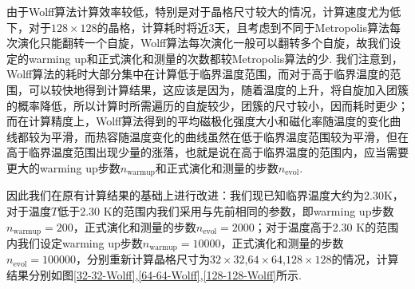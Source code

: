 \documentclass[UTF8,10pt,a4paper]{article}
\theoremstyle{Problem}
\theoremstyle{Solution}
\begin{document}
\clearpage

由于Wolff算法计算效率较低，特别是对于晶格尺寸较大的情况，计算速度尤为低下，对于$128\times 128$的晶格，计算耗时将近3天，且考虑到不同于Metropolis算法每次演化只能翻转一个自旋，Wolff算法每次演化一般可以翻转多个自旋，故我们设定的warming up和正式演化和测量的次数都较Metropolis算法的少. 我们注意到，Wolff算法的耗时大部分集中在计算低于临界温度范围，而对于高于临界温度的范围，可以较快地得到计算结果，这应该是因为，随着温度的上升，将自旋加入团簇的概率降低，所以计算时所需遍历的自旋较少，团簇的尺寸较小，因而耗时更少；而在计算精度上，Wolff算法得到的平均磁极化强度大小和磁化率随温度的变化曲线都较为平滑，而热容随温度变化的曲线虽然在低于临界温度范围较为平滑，但在高于临界温度范围出现少量的涨落，也就是说在高于临界温度的范围内，应当需要更大的warming up步数$n_{\text{warmup}}$和正式演化和测量的步数$n_{\text{evol}}$.

因此我们在原有计算结果的基础上进行改进：我们现已知临界温度大约为$2.30$K，对于温度$T$低于$2.30$ K的范围内我们采用与先前相同的参数，即warming up步数$n_{\text{warmup}}=200$，正式演化和测量的步数$n_{\text{evol}}=2000$；对于温度高于$2.30$ K的范围内我们设定warming up步数$n_{\text{warmup}}=10000$，正式演化和测量的步数$n_{\text{evol}}=100000$，分别重新计算晶格尺寸为$32\times 32$,$64\times 64$,$128\times 128$的情况，计算结果分别如图\ref{32-32-Wolff},\ref{64-64-Wolff},\ref{128-128-Wolff}所示.
\end{document}
